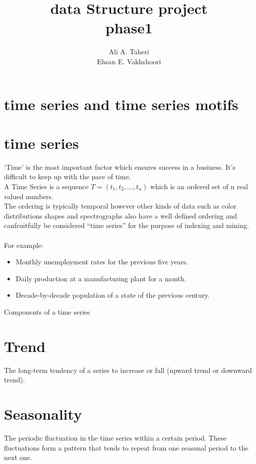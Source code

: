 \documentclass[12pt,a4paper]{article}
\begin{document}
	\begin{titlepage}
		\title{data Structure project \\ phase1}
		\maketitle
		\begin{center}
			\author{Ali A. Taheri \\ Ehsan E. Vakhshoori}
		\end{center}
	\end{titlepage}
	\newpage
	\tableofcontents
	\newpage
	\section{time series and time series motifs}
	\section*{time series}
	‘Time’ is the most important factor which ensures success in a business. It’s  difficult to keep up with the pace of time.
	\\ A Time Series is a sequence $T=(t_{1} ,t_{2} ,...,t_{n} )$ which is an ordered set of n real valued numbers.
	\\ The ordering is typically temporal however other kinds of data such as color distributions shapes and spectrographs also have a well defined ordering and canfruitfully be considered “time series” for the purpose of indexing and mining.
	\\ \\ For example:
	\begin{itemize}
		\item{Monthly unemployment rates for the previous five years.}
		\item{Daily production at a manufacturing plant for a month.}
		\item{Decade-by-decade population of a state of the previous century.}		
	\end{itemize}
	Components of a time series
	\section*{Trend}
	The long-term tendency of a series to increase or fall (upward trend or downward trend).
	\section*{Seasonality}
	The periodic fluctuation in the time series within a certain period. These fluctuations form a pattern that tends to repeat from one seasonal period to the next one.
\end{document}

